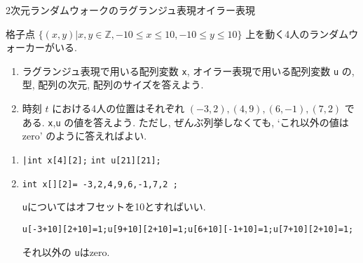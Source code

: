 \makeatletter  
{}%
\makeatother

\begin{theme}{2次元ランダムウォークのラグランジュ表現オイラー表現}
  \begin{memo}
  \end{memo}
\begin{prob}
  格子点 $\{(x,y)|x,y\in\mathbb{Z}, -10\leq x\leq10, -10\leq y \leq 10\}$ 上を動く4人のランダムウォーカーがいる.
  \begin{enumerate}
  \item ラグランジュ表現で用いる配列変数 \verb|x|,
        オイラー表現で用いる配列変数 \verb|u| の, 型, 配列の次元, 配列のサイズを答えよう.
  \item 時刻 $t$ における4人の位置はそれぞれ $(-3,2),(4,9),(6,-1),(7,2)$ である. \verb|x|,\verb|u| の値を答えよう. ただし, ぜんぶ列挙しなくても, `これ以外の値はzero' のように答えればよい.
  \end{enumerate}
  \end{prob}
  \begin{sol}
    \begin{enumerate}
    \item 
      \texttt{|int x[4][2];}
      \texttt{int u[21][21];} 
    \item 
      \texttt{int x[][2]={ {-3,2},{4,9},{6,-1},{7,2} };}

      \texttt{u}についてはオフセットを10とすればいい.

      \texttt{u[-3+10][2+10]=1;u[9+10][2+10]=1;u[6+10][-1+10]=1;u[7+10][2+10]=1;}

      それ以外の \texttt{u}はzero.
    \end{enumerate}
  \end{sol}
\end{theme}

\makeatletter
{}
\makeatother

